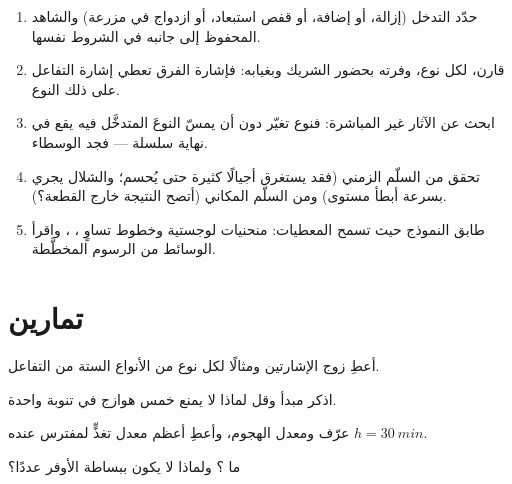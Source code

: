 \begin{method}\label{met:b1:species-interactions:reading}
\begin{enumerate}
  \item حدّد التدخل (إزالة، أو إضافة، أو قفص استبعاد،
        أو ازدواج في مزرعة) والشاهد المحفوظ إلى جانبه في
        الشروط نفسها.
  \item قارن، لكل نوع، وفرته بحضور الشريك وبغيابه:
        فإشارة الفرق تعطي إشارة التفاعل على
        ذلك النوع.
  \item ابحث عن الآثار غير المباشرة: فنوع تغيّر دون أن يمسّ
        النوعَ المتدخَّل فيه يقع في نهاية سلسلة ---
        فجد الوسطاء.
  \item تحقق من السلّم الزمني (فقد يستغرق  أجيالًا كثيرة
        حتى يُحسم؛ والشلال يجري بسرعة أبطأ مستوى)
        ومن السلّم المكاني (أتصح النتيجة خارج القطعة؟).
  \item طابق النموذج حيث تسمح المعطيات: منحنيات لوجستية
        وخطوط تساوٍ ،  ، واقرأ الوسائط من الرسوم المخطَّطة.
\end{enumerate}
\end{method}

\section{تمارين}

\begin{exercise}[$\star$]\label{exo:b1:species-interactions:1}
أعطِ زوج الإشارتين ومثالًا لكل نوع من الأنواع الستة من
التفاعل.
\end{exercise}

\begin{exercise}[$\star$]\label{exo:b1:species-interactions:2}
اذكر مبدأ  وقل لماذا لا يمنع
خمس هوازج في تنوبة واحدة.
\end{exercise}

\begin{exercise}[$\star$]\label{exo:b1:species-interactions:3}
عرّف  ومعدل الهجوم، وأعطِ أعظم معدل تغذٍّ
لمفترس عنده $h = \qty{30}{min}$.
\end{exercise}

\begin{exercise}[$\star$]\label{exo:b1:species-interactions:4}
ما ؟ ولماذا لا يكون  ببساطة
الأوفر عددًا؟
\end{exercise}

